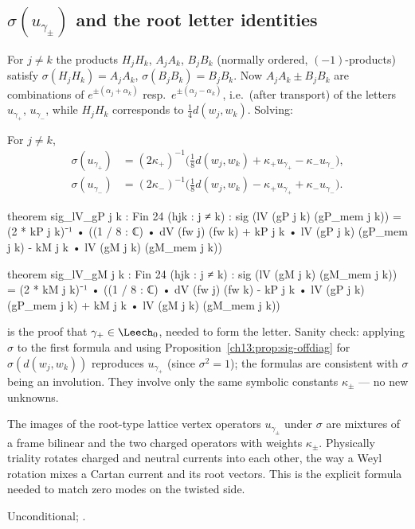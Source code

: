 \subsection{\texorpdfstring{$\sigma(u_{\gamma_\pm})$ and the root letter identities}{sigma(ugammapm) and the root letter identities}}
For $j\neq k$ the products $H_jH_k$, $A_jA_k$, $B_jB_k$ (normally ordered, $(-1)$-products) satisfy
$\sigma(H_jH_k)=A_jA_k$, $\sigma(B_jB_k)=B_jB_k$. Now $A_jA_k\pm B_jB_k$ are combinations of $e^{\pm(\alpha_j+\alpha_k)}$
resp.\ $e^{\pm(\alpha_j-\alpha_k)}$, i.e.\ (after transport) of the letters $u_{\gamma_+}$, $u_{\gamma_-}$, while $H_jH_k$
corresponds to $\tfrac14d(w_j,w_k)$. Solving:
\begin{theorem}\label{ch13:thm:sig-lV}
For $j\ne k$,
\begin{align*}
  \sigma(u_{\gamma_+})&=(2\kappa_+)^{-1}\bigl(\tfrac18d(w_j,w_k)+\kappa_+u_{\gamma_+}-\kappa_-u_{\gamma_-}\bigr),\\
  \sigma(u_{\gamma_-})&=(2\kappa_-)^{-1}\bigl(\tfrac18d(w_j,w_k)-\kappa_+u_{\gamma_+}+\kappa_-u_{\gamma_-}\bigr).
\end{align*}
\end{theorem}
\begin{leancode}
theorem sig_lV_gP {j k : Fin 24} (hjk : j ≠ k) :
    sig (lV (gP j k) (gP_mem j k)) = (2 * kP j k)⁻¹ • ((1 / 8 : ℂ) • dV (fw j) (fw k)
      + kP j k • lV (gP j k) (gP_mem j k) - kM j k • lV (gM j k) (gM_mem j k))

theorem sig_lV_gM {j k : Fin 24} (hjk : j ≠ k) :
    sig (lV (gM j k) (gM_mem j k)) = (2 * kM j k)⁻¹ • ((1 / 8 : ℂ) • dV (fw j) (fw k)
      - kP j k • lV (gP j k) (gP_mem j k) + kM j k • lV (gM j k) (gM_mem j k))
\end{leancode}
\begin{dictionary}
 is the proof that $\gamma_+\in\Leech_0$, needed to form the letter. Sanity check: applying $\sigma$ to
the first formula and using Proposition~\ref{ch13:prop:sig-offdiag} for $\sigma(d(w_j,w_k))$ reproduces $u_{\gamma_+}$
(since $\sigma^2=1$); the formulas are consistent with $\sigma$ being an involution. They involve only the same
symbolic constants $\kappa_\pm$ --- no new unknowns.
\end{dictionary}
\begin{physics}
The images of the root-type lattice vertex operators $u_{\gamma_\pm}$ under $\sigma$ are mixtures of a frame bilinear and the two charged operators with weights $\kappa_\pm$. Physically triality rotates charged and neutral currents into each other, the way a Weyl rotation mixes a Cartan current and its root vectors. This is the explicit formula needed to match zero modes on the twisted side.
\end{physics}
\begin{status}Unconditional; .\end{status}

